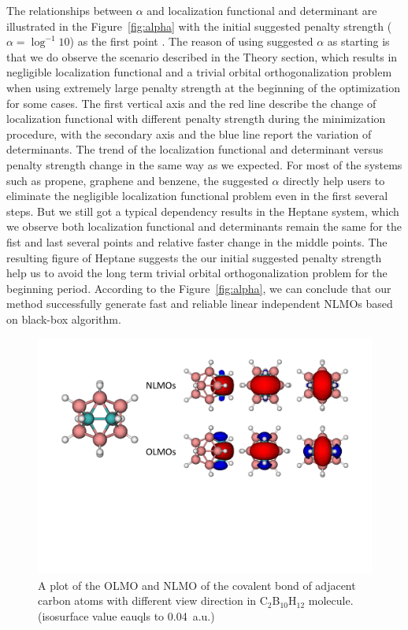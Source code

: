 \documentclass[aps,prl,reprint,amsmath,amssymb]{revtex4-1}
\begin{document}
The relationships between $\alpha$ and localization functional and determinant are illustrated in the Figure~\ref{fig:alpha} with the initial suggested penalty strength ($\alpha = \log^{-1} 10$) as the first point .
The reason of using suggested $\alpha$ as starting is that we do observe the scenario described in the Theory section, which results in negligible localization functional and a trivial orbital orthogonalization problem when using extremely large penalty strength at the beginning of the optimization for some cases.
The first vertical axis and the red line describe the change of localization functional with different penalty strength during the minimization procedure, with the secondary axis and the blue line report the variation of determinants.
The trend of the localization functional and determinant versus penalty strength change in the same way as we expected.
For most of the systems such as propene, graphene and benzene, the suggested $\alpha$ directly help users to eliminate the  negligible localization functional problem even in the first several steps.  
But we still got a typical dependency results in the Heptane system, which we observe both localization functional and determinants remain the same for the fist and last several points and relative faster change in the middle points.
The resulting figure of Heptane suggests the our initial suggested penalty strength help us to avoid the long term trivial orbital orthogonalization problem for the beginning period.
According to the Figure~\ref{fig:alpha}, we can conclude that our method successfully generate fast and reliable linear independent NLMOs based on black-box algorithm.

\begin{figure}[hbpt]
\centering
\includegraphics[width=\textwidth]{figure_3.pdf}
\caption{A plot of the OLMO and NLMO of the covalent bond of adjacent carbon atoms with different view direction  in C$_2$B$_{10}$H$_{12}$ molecule. (isosurface value eauqls to 0.04~a.u.)}
\label{fig:boro}
\end{figure}
\end{document}
